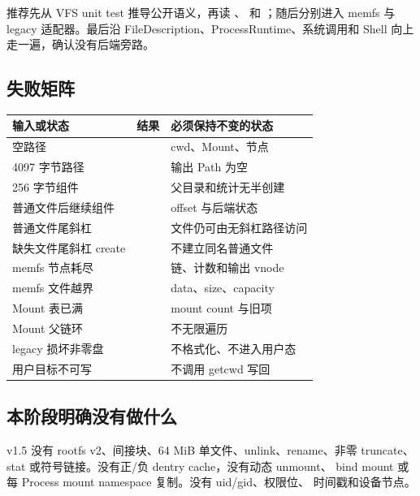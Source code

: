 推荐先从 VFS unit test 推导公开语义，再读 、
 和 ；随后分别进入 memfs 与
legacy 适配器。最后沿 FileDescription、ProcessRuntime、系统调用和 Shell
向上走一遍，确认没有后端旁路。

\subsection{失败矩阵}

\begin{longtable}{L{0.27\textwidth}L{0.28\textwidth}L{0.33\textwidth}}
\toprule
输入或状态 & 结果 & 必须保持不变的状态\\
\midrule
空路径 & {\small{}} & cwd、Mount、节点\\
4097 字节路径 & {\small{}} & 输出 Path 为空\\
256 字节组件 & {\small{}} & 父目录和统计无半创建\\
普通文件后继续组件 & {\small{}} & offset 与后端状态\\
普通文件尾斜杠 & {\small{}} & 文件仍可由无斜杠路径访问\\
缺失文件尾斜杠 create & {\small{}} & 不建立同名普通文件\\
memfs 节点耗尽 & {\small{}} & 链、计数和输出 vnode\\
memfs 文件越界 & {\small{}} & data、size、capacity\\
Mount 表已满 & {\small{}} & mount count 与旧项\\
Mount 父链环 & {\small{}} & 不无限遍历\\
legacy 损坏非零盘 & {\small{}} & 不格式化、不进入用户态\\
用户目标不可写 & {\small{}} & 不调用 getcwd 写回\\
\bottomrule
\end{longtable}

\subsection{本阶段明确没有做什么}

v1.5 没有 rootfs v2、间接块、64 MiB 单文件、unlink、rename、非零
truncate、stat 或符号链接。没有正/负 dentry cache，没有动态 unmount、
bind mount 或每 Process mount namespace 复制。没有 uid/gid、权限位、
时间戳和设备节点。

